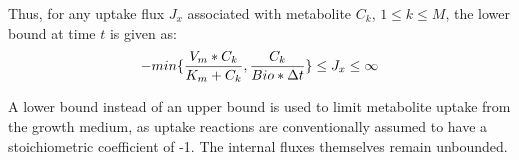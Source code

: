 Thus, for any uptake flux $J_x$ associated with metabolite $C_k$, $1 \leq k \leq M$, the lower bound at time $t$ is given as:
\[\large -min\{ \frac{V_m * C_k}{K_m + C_k}, \frac{C_k}{Bio * \Delta t}  \} \leq J_x \leq \infty \]

A lower bound instead of an upper bound is used to limit metabolite uptake from the growth medium, as uptake reactions are conventionally assumed to have a stoichiometric coefficient  of -1. The internal fluxes themselves remain unbounded.

